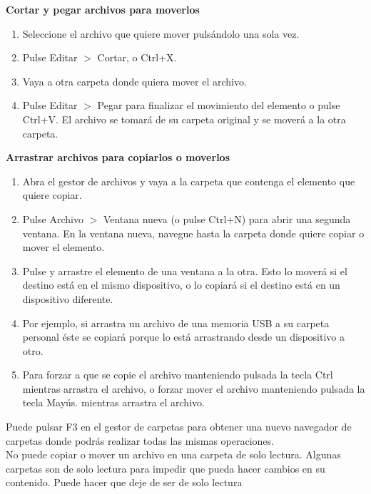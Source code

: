 {\bf Cortar y pegar archivos para moverlos}\\
\begin{enumerate}
\item Seleccione el archivo que quiere mover pulsándolo una sola vez.
\item Pulse Editar $>$ Cortar, o Ctrl+X.
\item Vaya a otra carpeta donde quiera mover el archivo.
\item Pulse Editar $>$ Pegar para finalizar el movimiento del elemento o pulse Ctrl+V. El archivo se tomará de su carpeta original y se moverá a la otra carpeta.
\end{enumerate}

{\bf Arrastrar archivos para copiarlos o moverlos}
\begin{enumerate}
\item Abra el gestor de archivos y vaya a la carpeta que contenga el elemento que quiere copiar.
\item Pulse Archivo $>$ Ventana nueva (o pulse Ctrl+N) para abrir una segunda ventana. En la ventana nueva, navegue hasta la carpeta donde quiere copiar o mover el elemento.
\item Pulse y arrastre el elemento de una ventana a la otra. Esto lo moverá si el destino está en el mismo dispositivo, o lo copiará si el destino está en un dispositivo diferente.
\item Por ejemplo, si arrastra un archivo de una memoria USB a su carpeta personal éste se copiará porque lo está arrastrando desde un dispositivo a otro.
\item Para forzar a que se copie el archivo manteniendo pulsada la tecla Ctrl mientras arrastra el archivo, o forzar mover el archivo manteniendo pulsada la tecla Mayús. mientras arrastra el archivo.
\end{enumerate}
Puede pulsar F3 en el gestor de carpetas para obtener una nuevo navegador de carpetas donde podrás realizar todas las mismas operaciones.\\

No puede copiar o mover un archivo en una carpeta de solo lectura. Algunas carpetas son de solo lectura para impedir que pueda hacer cambios en su contenido. Puede hacer que deje de ser de solo lectura
